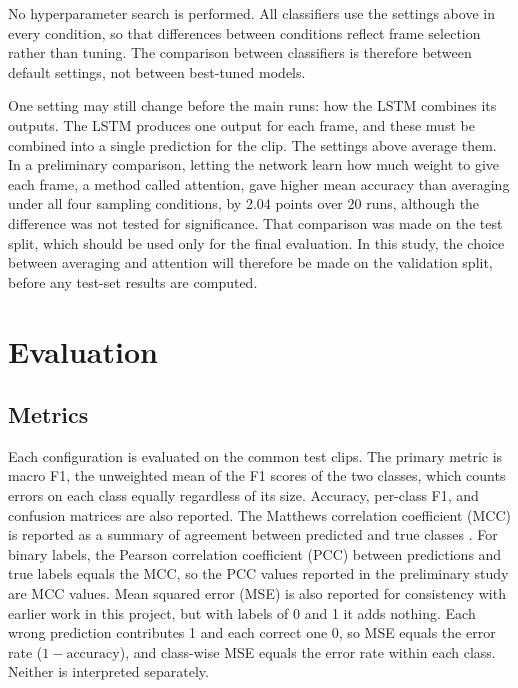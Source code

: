 No hyperparameter search is performed. All classifiers use the settings above in every condition, so that differences between conditions reflect frame selection rather than tuning. The comparison between classifiers is therefore between default settings, not between best-tuned models.

One setting may still change before the main runs: how the LSTM combines its outputs. The LSTM produces one output for each frame, and these must be combined into a single prediction for the clip. The settings above average them. In a preliminary comparison, letting the network learn how much weight to give each frame, a method called attention, gave higher mean accuracy than averaging under all four sampling conditions, by 2.04 points over 20 runs, although the difference was not tested for significance. That comparison was made on the test split, which should be used only for the final evaluation. In this study, the choice between averaging and attention will therefore be made on the validation split, before any test-set results are computed.



\section{Evaluation}
\label{sec:evaluation}

\subsection{Metrics}
\label{sec:metrics}

Each configuration is evaluated on the common test clips. The primary metric is macro F1, the unweighted mean of the F1 scores of the two classes, which counts errors on each class equally regardless of its size. Accuracy, per-class F1, and confusion matrices are also reported. The Matthews correlation coefficient (MCC) is reported as a summary of agreement between predicted and true classes \cite{chicco2020}. For binary labels, the Pearson correlation coefficient (PCC) between predictions and true labels equals the MCC, so the PCC values reported in the preliminary study are MCC values. Mean squared error (MSE) is also reported for consistency with earlier work in this project, but with labels of 0 and 1 it adds nothing. Each wrong prediction contributes 1 and each correct one 0, so MSE equals the error rate ($1 - \text{accuracy}$), and class-wise MSE equals the error rate within each class. Neither is interpreted separately.

